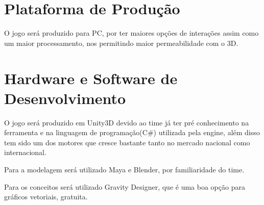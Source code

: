 
\section{Plataforma de Produção}

O jogo será produzido para PC, por ter maiores opções de interações assim como um maior processamento, nos permitindo maior permeabilidade com o 3D.


\section{Hardware e Software de Desenvolvimento}

O jogo será produzido em Unity3D devido ao time já ter pré conhecimento na ferramenta e na linguagem de programação(C\#) utilizada pela engine, além disso tem sido um dos motores que cresce bastante tanto no mercado nacional como internacional.

Para a modelagem será utilizado Maya e Blender, por familiaridade do time.

Para os conceitos será utilizado Gravity Designer, que é uma boa opção para gráficos vetoriais, gratuita.



